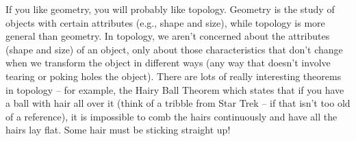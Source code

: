 \begin{comment}

\ActivitySolution
\be
\item Let $S = \{A \text{ is a set} \mid A \notin A\}$. 
	\ba
	\item If $S \in S$, then $S$ does not contain itself as an element. But then $S$ cannot be in $S$, so this is not possible.

	\item If $S \notin S$, then $S$ must contain itself as an element. But this contradicts the fact that $S \notin S$. 

	\item Our current definition of a set leads to a paradox -- a set with an element that is neither in the set nor not in the set. 
	
	\ea

\item
	\ba
	\item A subset $U$ of a set $S$ is a collection of elements of $S$. That is, $U$ is a subset of $S$ if $x \in S$ whenever $x \in U$. For example, if $S = \{1,2,3,4\}$, then $\{1,2\}$ and $\{1,3,4\}$ are subsets of $S$. 
	
	\item Since every element of $A$ is also an element of $A$, by our definition it is the case that $A$ is a subset of $A$. 
	
	\item The empty set is the set that contains no elements. Since $\emptyset$ contains no elements, by default every element of $\emptyset$ is an element of any other set. So $\emptyset$ is a subset of every set. 
	
	\ea	
\ee


\end{comment}


\label{sec_basic_top}

If you like geometry, you will probably like topology. Geometry is the study of objects with certain attributes (e.g., shape and size), while topology is more general than geometry. In topology, we aren't concerned about the attributes (shape and size) of an object, only about those characteristics that don't change when we transform the object in different ways (any way that doesn't involve tearing or poking holes the object).  There are lots of really interesting theorems in topology -- for example, the Hairy Ball Theorem which states that if you have a ball with hair all over it (think of a tribble from Star Trek -- if that isn't too old of a reference), it is impossible to comb the hairs continuously and have all the hairs lay flat. Some hair must be sticking straight up! 

